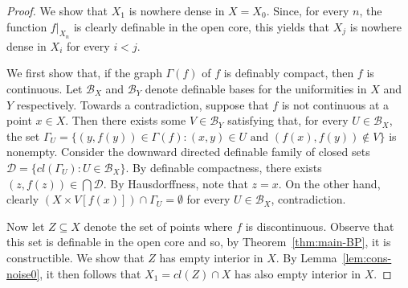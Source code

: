 \documentclass[12pt]{article}
\newcommand{\Bb}{\mathcal{B}}
\newcommand{\Dd}{\mathcal{D}}
\newcommand{\dF}{\ensuremath{F_\sigma^{\text{def}}}}
\newcommand{\BU}{\Bb} %
\theoremstyle{definition}
\theoremstyle{remark}
\begin{document}
\begin{proof}
We show that $X_1$ is nowhere dense in $X=X_0$. Since, for every $n$, the function $f|_{X_n}$ is clearly definable in the open core, this yields that $X_j$ is nowhere dense in $X_i$ for every $i<j$. 

We first show that, if the graph $\Gamma(f)$ of $f$ is definably compact, then $f$ is continuous. Let $\BU_X$ and $\BU_Y$ denote definable bases for the uniformities in $X$ and $Y$ respectively. Towards a contradiction, suppose that $f$ is not continuous at a point $x\in X$. Then there exists some $V\in \BU_Y$ satisfying that, for every $U\in \BU_X$, the set $\Gamma_U=\{ (y,f(y))\in \Gamma(f) : (x,y)\in U \text{ and } (f(x),f(y))\notin V\}$ is nonempty. Consider the downward directed definable family of closed sets $\Dd=\{ cl(\Gamma_U) : U\in \BU_X\}$. By definable compactness, there exists $(z,f(z))\in \bigcap \Dd$. By Hausdorffness, note that $z=x$. On the other hand, clearly $(X\times V[f(x)]) \cap \Gamma_U = \emptyset$ for every $U\in \BU_X$, contradiction.



Now let $Z\subseteq X$ denote the set of points where $f$ is discontinuous. Observe that this set is definable in the open core and so, by Theorem~\ref{thm:main-BP}, it is constructible. We show that $Z$ has empty interior in $X$. By Lemma~\ref{lem:cons-noise0}, it then follows that $X_1=cl(Z)\cap X$ has also empty interior in $X$. 


\end{proof}
\end{document}
